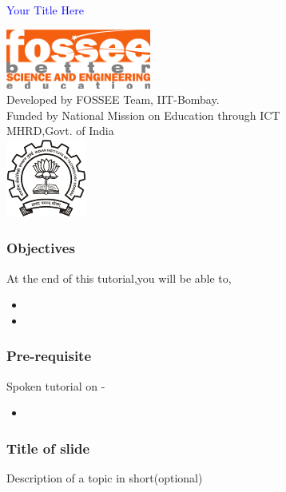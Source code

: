 \documentclass[presentation]{beamer}
\title{}
\author{FOSSEE}
\date{}
\begin{document}
\begin{frame}

\begin{center}
\vspace{12pt}
\textcolor{blue}{\huge Your Title Here}
\end{center}
\vspace{18pt}
\begin{center}
\vspace{10pt}
\includegraphics[scale=0.95]{../images/fossee-logo.png}\\
\vspace{5pt}
\scriptsize Developed by FOSSEE Team, IIT-Bombay. \\ 
\scriptsize Funded by National Mission on Education through ICT\\
\scriptsize  MHRD,Govt. of India\\
\includegraphics[scale=0.30]{../images/iitb-logo.png}\\
\end{center}
\end{frame}
\begin{frame}
\frametitle{Objectives}
\label{sec-2}

At the end of this tutorial,you will be able to,
\begin{itemize}
\item 
\item  
\end{itemize}
\end{frame}
\begin{frame}
\frametitle{Pre-requisite}
\label{sec-3}

Spoken tutorial on -
\begin{itemize}
\item
\end{itemize}
\end{frame}
\begin{frame}
\frametitle{Title of slide}
\label{sec-4}

  Description of a topic in short(optional)
\end{frame}
\end{document}

